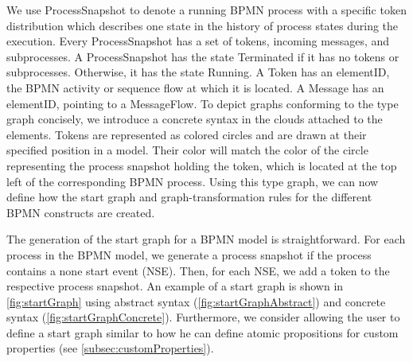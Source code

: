 \documentclass[submission, copyright, creativecommons]{eptcs}
\begin{document}
We use \textsf{ProcessSnapshot} to denote a running BPMN process with a specific token distribution which describes one state in the history of process states during the execution.
Every \textsf{ProcessSnapshot} has a set of \textsf{tokens}, incoming \textsf{messages}, and \textsf{subprocesses}.
A \textsf{ProcessSnapshot} has the state \textsf{Terminated} if it has no \textsf{tokens} or \textsf{subprocesses}.
Otherwise, it has the state \textsf{Running}.
A \textsf{Token} has an \textsf{elementID}, the BPMN activity or sequence flow at which it is located.
A \textsf{Message} has an \textsf{elementID}, pointing to a \textsf{MessageFlow}.
To depict graphs conforming to the type graph concisely, we introduce a concrete syntax in the clouds attached to the elements.
Tokens are represented as colored circles and are drawn at their specified position in a model.
Their color will match the color of the circle representing the process snapshot holding the token, which is located at the top left of the corresponding BPMN process.
Using this type graph, we can now define how the start graph and graph-transformation rules for the different BPMN constructs are created.

The generation of the start graph for a BPMN model is straightforward.
For each process in the BPMN model, we generate a process snapshot if the process contains a none start event (NSE).
Then, for each NSE, we add a token to the respective process snapshot.
An example of a start graph is shown in \cref{fig:startGraph} using abstract syntax (\cref{fig:startGraphAbstract}) and concrete syntax (\cref{fig:startGraphConcrete}).
Furthermore, we consider allowing the user to define a start graph similar to how he can define atomic propositions for custom properties (see \cref{subsec:customProperties}).
\end{document}
